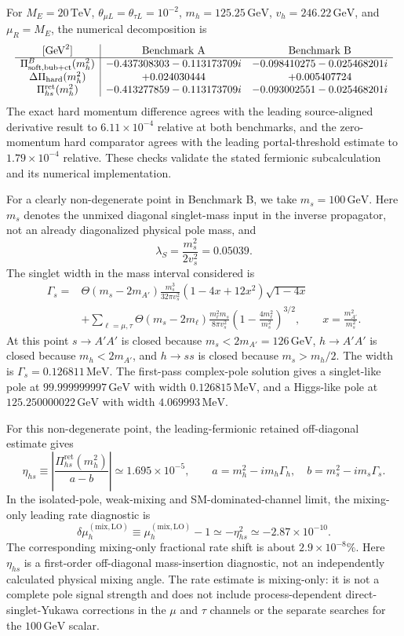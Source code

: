\documentclass[12pt,a4paper]{article}
\begin{document}
For \(M_E=20\,\mathrm{TeV}\), \(\theta_{\mu L}=\theta_{\tau L}=10^{-2}\), \(m_h=125.25\,\mathrm{GeV}\), \(v_h=246.22\,\mathrm{GeV}\), and \(\mu_R=M_E\), the numerical decomposition is
\[
\resizebox{\textwidth}{!}{$
\begin{array}{c|cc}
[\mathrm{GeV}^2]&\text{Benchmark A}&\text{Benchmark B}\\ \hline
\Pi_{\mathrm{soft,bub+ct}}^B(m_h^2)&
-0.437308303-0.113173709i&
-0.098410275-0.025468201i\\
\Delta\Pi_{\mathrm{hard}}(m_h^2)&
+0.024030444&
+0.005407724\\
\Pi_{hs}^{\mathrm{ret}}(m_h^2)&
-0.413277859-0.113173709i&
-0.093002551-0.025468201i
\end{array}
$}
\]
The exact hard momentum difference agrees with the leading source-aligned derivative result to \(6.11\times10^{-4}\) relative at both benchmarks, and the zero-momentum hard comparator agrees with the leading portal-threshold estimate to \(1.79\times10^{-4}\) relative. These checks validate the stated fermionic subcalculation and its numerical implementation.

For a clearly non-degenerate point in Benchmark B, we take \(m_s=100\,\mathrm{GeV}\). Here \(m_s\) denotes the unmixed diagonal singlet-mass input in the inverse propagator, not an already diagonalized physical pole mass, and
\[
\lambda_S=\frac{m_s^2}{2v_s^2}=0.05039.
\]
The singlet width in the mass interval considered is
\[
\begin{aligned}
\Gamma_s={}&
\Theta(m_s-2m_{A'})
\frac{m_s^3}{32\pi v_s^2}
(1-4x+12x^2)\sqrt{1-4x}\\
&+\sum_{\ell=\mu,\tau}
\Theta(m_s-2m_\ell)
\frac{m_\ell^2m_s}{8\pi v_s^2}
\left(1-\frac{4m_\ell^2}{m_s^2}\right)^{3/2},
\qquad x=\frac{m_{A'}^2}{m_s^2}.
\end{aligned}
\]
At this point \(s\to A'A'\) is closed because \(m_s<2m_{A'}=126\,\mathrm{GeV}\), \(h\to A'A'\) is closed because \(m_h<2m_{A'}\), and \(h\to ss\) is closed because \(m_s>m_h/2\). The width is \(\Gamma_s=0.126811\,\mathrm{MeV}\). The first-pass complex-pole solution gives a singlet-like pole at \(99.999999997\,\mathrm{GeV}\) with width \(0.126815\,\mathrm{MeV}\), and a Higgs-like pole at \(125.250000022\,\mathrm{GeV}\) with width \(4.069993\,\mathrm{MeV}\).

For this non-degenerate point, the leading-fermionic retained off-diagonal estimate gives
\[
\eta_{hs}\equiv\left|\frac{\Pi_{hs}^{\mathrm{ret}}(m_h^2)}{a-b}\right|
\simeq1.695\times10^{-5},
\qquad
a=m_h^2-im_h\Gamma_h,\quad b=m_s^2-im_s\Gamma_s.
\]
In the isolated-pole, weak-mixing and SM-dominated-channel limit, the mixing-only leading rate diagnostic is
\[
\delta\mu_h^{(\mathrm{mix,LO})}
\equiv\mu_h^{(\mathrm{mix,LO})}-1
\simeq-\eta_{hs}^2
\simeq-2.87\times10^{-10}.
\]
The corresponding mixing-only fractional rate shift is about \(2.9\times10^{-8}\%\). Here \(\eta_{hs}\) is a first-order off-diagonal mass-insertion diagnostic, not an independently calculated physical mixing angle. The rate estimate is mixing-only: it is not a complete pole signal strength and does not include process-dependent direct-singlet-Yukawa corrections in the \(\mu\) and \(\tau\) channels or the separate searches for the \(100\,\mathrm{GeV}\) scalar.
\end{document}
